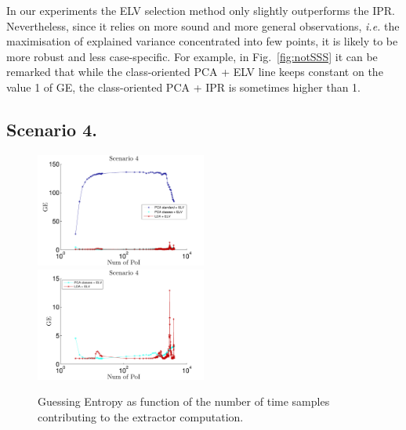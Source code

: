 \begin{remark}
In our experiments the ELV selection method only slightly outperforms the IPR. Nevertheless, since it relies on more sound and more general observations, {\em i.e.} the maximisation of explained variance concentrated into few points, it is likely to be more robust and less case-specific. For example, in Fig.~\ref{fig:notSSS} it can be remarked that while the class-oriented PCA + ELV line keeps constant on the value 1 of GE, the class-oriented PCA + IPR is sometimes higher than 1.
\end{remark}

\subsection{Scenario 4.}

\begin{figure}
\includegraphics[width=0.5\textwidth]{../Figures/CARDIS2015/Criterion4.pdf}
\includegraphics[width=0.5\textwidth]{../Figures/CARDIS2015/Criterion4cutted.pdf} 
\caption{Guessing Entropy as function of the number of time samples contributing to the extractor computation.}\label{fig:4}
\end{figure}

